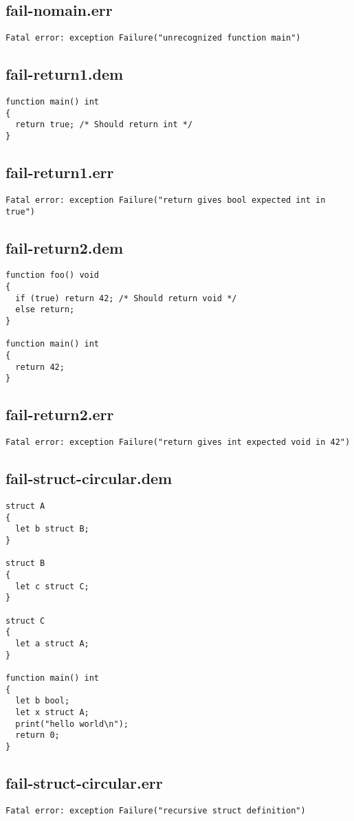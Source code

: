 \subsection{fail-nomain.err}
\begin{lstlisting}
Fatal error: exception Failure("unrecognized function main")
\end{lstlisting}
\subsection{fail-return1.dem}
\begin{lstlisting}
function main() int
{
  return true; /* Should return int */
}
\end{lstlisting}
\subsection{fail-return1.err}
\begin{lstlisting}
Fatal error: exception Failure("return gives bool expected int in true")
\end{lstlisting}
\subsection{fail-return2.dem}
\begin{lstlisting}
function foo() void
{
  if (true) return 42; /* Should return void */
  else return;
}

function main() int
{
  return 42;
}
\end{lstlisting}
\subsection{fail-return2.err}
\begin{lstlisting}
Fatal error: exception Failure("return gives int expected void in 42")
\end{lstlisting}
\subsection{fail-struct-circular.dem}
\begin{lstlisting}
struct A
{
  let b struct B;
}

struct B
{
  let c struct C;
}

struct C
{
  let a struct A;
}

function main() int
{
  let b bool;
  let x struct A;
  print("hello world\n");
  return 0;
}
\end{lstlisting}
\subsection{fail-struct-circular.err}
\begin{lstlisting}
Fatal error: exception Failure("recursive struct definition")
\end{lstlisting}
